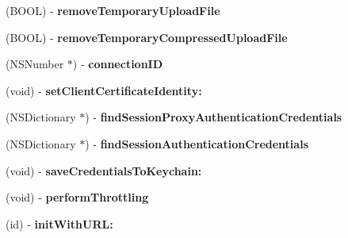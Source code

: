 \begin{DoxyCompactItemize}
\item 
\hypertarget{interface_a_s_i_h_t_t_p_request_aaf8e3adbbf00110b67232158921553c0}{
(\-B\-O\-O\-L) -\/ {\bfseries remove\-Temporary\-Upload\-File}}
\label{interface_a_s_i_h_t_t_p_request_aaf8e3adbbf00110b67232158921553c0}

\item 
\hypertarget{interface_a_s_i_h_t_t_p_request_a4f8b19d66be57ffad0d6128182c98414}{
(\-B\-O\-O\-L) -\/ {\bfseries remove\-Temporary\-Compressed\-Upload\-File}}
\label{interface_a_s_i_h_t_t_p_request_a4f8b19d66be57ffad0d6128182c98414}

\item 
\hypertarget{interface_a_s_i_h_t_t_p_request_a3e06c0a51784d32cc8198f616e63c530}{
(\-N\-S\-Number $\ast$) -\/ {\bfseries connection\-I\-D}}
\label{interface_a_s_i_h_t_t_p_request_a3e06c0a51784d32cc8198f616e63c530}

\item 
\hypertarget{interface_a_s_i_h_t_t_p_request_a4f24e48396e06b8a81de111e19c1314a}{
(void) -\/ {\bfseries set\-Client\-Certificate\-Identity\-:}}
\label{interface_a_s_i_h_t_t_p_request_a4f24e48396e06b8a81de111e19c1314a}

\item 
\hypertarget{interface_a_s_i_h_t_t_p_request_a480d62ba0d9ba8d1a64b25b45fb2d965}{
(\-N\-S\-Dictionary $\ast$) -\/ {\bfseries find\-Session\-Proxy\-Authentication\-Credentials}}
\label{interface_a_s_i_h_t_t_p_request_a480d62ba0d9ba8d1a64b25b45fb2d965}

\item 
\hypertarget{interface_a_s_i_h_t_t_p_request_a0f38ffc0ae199e83262895f640c9c263}{
(\-N\-S\-Dictionary $\ast$) -\/ {\bfseries find\-Session\-Authentication\-Credentials}}
\label{interface_a_s_i_h_t_t_p_request_a0f38ffc0ae199e83262895f640c9c263}

\item 
\hypertarget{interface_a_s_i_h_t_t_p_request_a3a57684f5aba49781ec3c9c9ef1516a6}{
(void) -\/ {\bfseries save\-Credentials\-To\-Keychain\-:}}
\label{interface_a_s_i_h_t_t_p_request_a3a57684f5aba49781ec3c9c9ef1516a6}

\item 
\hypertarget{interface_a_s_i_h_t_t_p_request_a510b47cc1be0b9c1968a9c8cc3859038}{
(void) -\/ {\bfseries perform\-Throttling}}
\label{interface_a_s_i_h_t_t_p_request_a510b47cc1be0b9c1968a9c8cc3859038}

\item 
\hypertarget{interface_a_s_i_h_t_t_p_request_aec75eeba26544a9da35e795011fe4a42}{
(id) -\/ {\bfseries init\-With\-U\-R\-L\-:}}
\label{interface_a_s_i_h_t_t_p_request_aec75eeba26544a9da35e795011fe4a42}


\end{DoxyCompactItemize}
